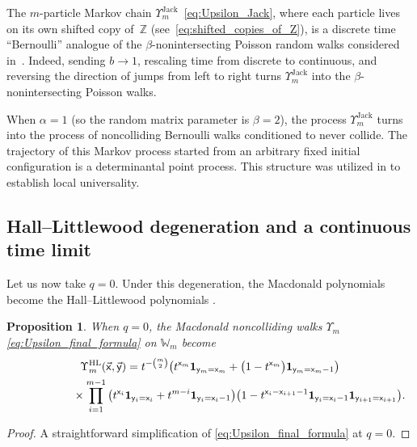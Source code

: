 \documentclass[pdftex]{sigma}
\numberwithin{equation}{section}
\newtheorem{Proposition}[Theorem]{Proposition}
{ \theoremstyle{definition}
\newtheorem{Definition}[Theorem]{Definition}}
\begin{document}
The $m$-particle
Markov chain
$\Upsilon_m^{\mathrm{Jack}}$~\eqref{eq:Upsilon_Jack},
where each particle lives on its own shifted copy of~$\mathbb{Z}$
(see~\eqref{eq:shifted_copies_of_Z}),
is a discrete time ``Bernoulli'' analogue
of the $\beta$-nonintersecting
Poisson random walks considered
in~\cite{huang2021beta}.
Indeed, sending $b\to1$, rescaling time from discrete to continuous,
and reversing the direction of jumps from left to right
turns
$\Upsilon_m^{\mathrm{Jack}}$
into the $\beta$-nonintersecting Poisson walks.

When $\alpha=1$ (so the random matrix parameter is $\beta=2$),
the process $\Upsilon_m^{\mathrm{Jack}}$
turns into the process of noncolliding Bernoulli walks
conditioned to never collide.
The trajectory of this Markov process started from an arbitrary
fixed initial configuration is a determinantal point process.
This structure was utilized
in
\cite{GorinPetrov2016universality}
to establish local universality.

\subsection{Hall--Littlewood degeneration
and a continuous time limit}

Let us now take $q=0$. Under this degeneration,
the Macdonald polynomials become
the Hall--Littlewood polynomials
\cite[Chapter~III]{Macdonald1995}.

\begin{Proposition}
	\label{prop:HL_degeneration}
	When $q=0$,
	the Macdonald noncolliding walks $\Upsilon_m$
	\eqref{eq:Upsilon_final_formula} on $\mathbb{W}_m$
	become
	\begin{gather}
			\Upsilon_m^{\mathrm{HL}}
			(\vec{\mathsf{x}},
			\vec{\mathsf{y}}) =
			t^{-\binom m2}	
			\big(t^{\mathsf{x}_m}\mathbf{1}_{\mathsf{y}_m=\mathsf{x}_m}
			+\big(1-t^{\mathsf{x}_m}\big)\mathbf{1}_{\mathsf{y}_m=
			\mathsf{x}_m-1}\big)
			\nonumber\\
\hphantom{\Upsilon_m^{\mathrm{HL}} (\vec{\mathsf{x}},\vec{\mathsf{y}}) =}{}
\times
			\prod_{i=1}^{m-1}
			\big(t^{\mathsf{x}_i}\mathbf{1}_{\mathsf{y}_i=\mathsf{x}_i}
			+t^{m-i}
			\mathbf{1}_{\mathsf{y}_i=\mathsf{x}_i-1}\big)
			\big(1-t^{\mathsf{x}_i-\mathsf{x}_{i+1}-1}
			\mathbf{1}_{\mathsf{y}_i=\mathsf{x}_i-1}
			\mathbf{1}_{\mathsf{y}_{i+1}=\mathsf{x}_{i+1}}\big).\label{eq:Upsilon_HL}
		\end{gather}
\end{Proposition}
\begin{proof}
	A straightforward simplification of \eqref{eq:Upsilon_final_formula}
	at $q=0$.
\end{proof}
\end{document}
